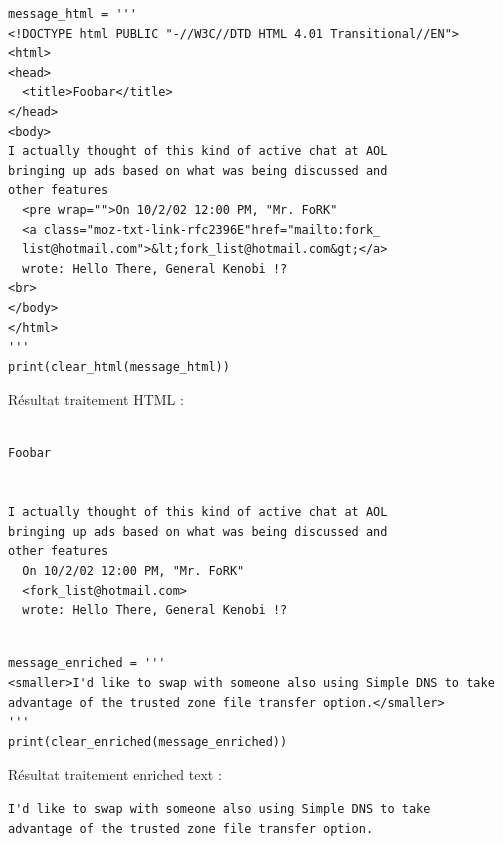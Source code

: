         \begin{lstlisting}[title=Traitement HTML,label={lst:clear_example_html}]
message_html = '''
<!DOCTYPE html PUBLIC "-//W3C//DTD HTML 4.01 Transitional//EN">
<html>
<head>
  <title>Foobar</title>
</head>
<body>
I actually thought of this kind of active chat at AOL
bringing up ads based on what was being discussed and
other features
  <pre wrap="">On 10/2/02 12:00 PM, "Mr. FoRK"
  <a class="moz-txt-link-rfc2396E"href="mailto:fork_
  list@hotmail.com">&lt;fork_list@hotmail.com&gt;</a>
  wrote: Hello There, General Kenobi !?
<br>
</body>
</html>
'''
print(clear_html(message_html))
        \end{lstlisting}
        Résultat traitement HTML :
        \begin{verbatim}

Foobar


I actually thought of this kind of active chat at AOL
bringing up ads based on what was being discussed and
other features
  On 10/2/02 12:00 PM, "Mr. FoRK"
  <fork_list@hotmail.com>
  wrote: Hello There, General Kenobi !?


        \end{verbatim}

        \begin{lstlisting}[title=Traitement enriched text,label={lst:clear_example_enriched}]
message_enriched = '''
<smaller>I'd like to swap with someone also using Simple DNS to take
advantage of the trusted zone file transfer option.</smaller>
'''
print(clear_enriched(message_enriched))
        \end{lstlisting}

        Résultat traitement enriched text :
        \begin{verbatim}
I'd like to swap with someone also using Simple DNS to take
advantage of the trusted zone file transfer option.
        \end{verbatim}


